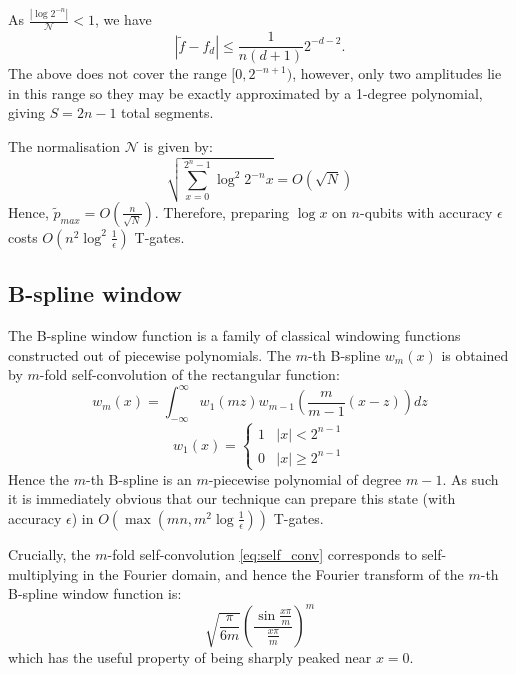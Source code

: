 \documentclass[aps,prx,twocolumn,floatfix,10pt,amssymb,amsfont,amsmath,superscriptaddress,float,nofootinbib,longbibliography,nobalancelastpage]{revtex4-2}
\theoremstyle{empty}
\begin{document}
As $\frac{|\log 2^{-n}|}{\mathcal{N}} < 1$, we have
\begin{equation}
    |\tilde f - f_{d}| \leq  \frac{1}{n(d+1)} 2^{-d-2}.
\end{equation}
The above does not cover the range $[0, 2^{-n+1})$, however, only two amplitudes lie in this range so they may be exactly approximated by a 1-degree polynomial, giving $S=2n-1$ total segments.

The normalisation $\mathcal{N}$ is given by:
\begin{equation}
    \sqrt{\sum_{x=0}^{2^n-1}\log^2 2^{-n} x} = O\left(\sqrt{N}\right)
\end{equation}
Hence, $\tilde{p}_{max} = O\left(\frac{n}{\sqrt{N}}\right)$. Therefore, preparing $\log{x}$ on $n$-qubits with accuracy $\epsilon$ costs $O(n^2 \log^2 \frac{1}{\epsilon})$ T-gates. 

\subsection{B-spline window}
\label{section:b_spline}
  The B-spline window function \cite{bspline} is a family of classical windowing functions constructed out of piecewise polynomials. The $m$-th B-spline $w_m(x)$ is obtained by $m$-fold self-convolution of the rectangular function:
  \begin{equation}
  \label{eq:self_conv}
      w_m(x) = \int_{-\infty}^{\infty} w_1(m z) w_{m-1}\left(\frac{m}{m-1}(x-z)\right) dz
  \end{equation}
  \begin{equation}
      w_1(x) = \begin{cases}
          1 & |x| < 2^{n-1}\\
          0 & |x| \geq 2^{n-1}
      \end{cases}
  \end{equation}
  Hence the $m$-th B-spline is an $m$-piecewise polynomial of degree $m-1$. As such it is immediately obvious that our technique can prepare this state (with accuracy $\epsilon$) in $O(\max(mn,m^2 \log \frac{1}{\epsilon}))$ T-gates. 
  
  Crucially, the $m$-fold self-convolution \eqref{eq:self_conv} corresponds to self-multiplying in the Fourier domain, and hence the Fourier transform of the $m$-th B-spline window function is:
\begin{equation}
    \sqrt{\frac{\pi}{6m}}\left(\frac{\sin \frac{x\pi}{m}}{ \frac{x\pi}{m}}\right)^m
\end{equation}
which has the useful property of being sharply peaked near $x=0$.
\end{document}
